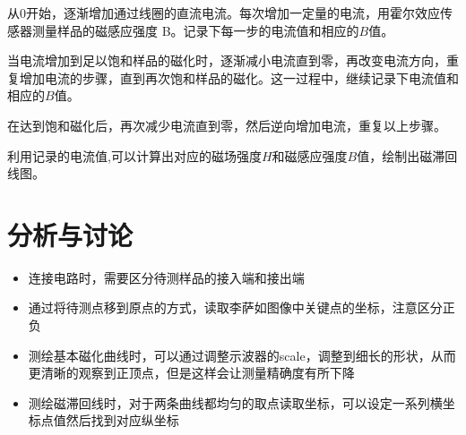 \documentclass{article}
\begin{document}
从0开始，逐渐增加通过线圈的直流电流。每次增加一定量的电流，用霍尔效应传感器测量样品的磁感应强度 B。记录下每一步的电流值和相应的$B$值。

当电流增加到足以饱和样品的磁化时，逐渐减小电流直到零，再改变电流方向，重复增加电流的步骤，直到再次饱和样品的磁化。这一过程中，继续记录下电流值和相应的$B$值。

在达到饱和磁化后，再次减少电流直到零，然后逆向增加电流，重复以上步骤。

利用记录的电流值,可以计算出对应的磁场强度$H$和磁感应强度$B$值，绘制出磁滞回线图。

\section{分析与讨论}
\begin{itemize}
    \item 连接电路时，需要区分待测样品的接入端和接出端
    \item 通过将待测点移到原点的方式，读取李萨如图像中关键点的坐标，注意区分正负
    \item 测绘基本磁化曲线时，可以通过调整示波器的scale，调整到细长的形状，从而更清晰的观察到正顶点，但是这样会让测量精确度有所下降
    \item 测绘磁滞回线时，对于两条曲线都均匀的取点读取坐标，可以设定一系列横坐标点值然后找到对应纵坐标
\end{itemize}
\end{document}
